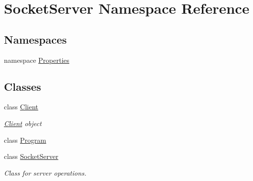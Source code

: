 \hypertarget{namespace_socket_server}{}\section{Socket\+Server Namespace Reference}
\label{namespace_socket_server}
\subsection*{Namespaces}
\begin{DoxyCompactItemize}
\item 
namespace \hyperlink{namespace_socket_server_1_1_properties}{Properties}
\end{DoxyCompactItemize}
\subsection*{Classes}
\begin{DoxyCompactItemize}
\item 
class \hyperlink{class_socket_server_1_1_client}{Client}
\begin{DoxyCompactList}\small\item\em \hyperlink{class_socket_server_1_1_client}{Client} object \end{DoxyCompactList}\item 
class \hyperlink{class_socket_server_1_1_program}{Program}
\item 
class \hyperlink{class_socket_server_1_1_socket_server}{Socket\+Server}
\begin{DoxyCompactList}\small\item\em Class for server operations. \end{DoxyCompactList}\end{DoxyCompactItemize}
